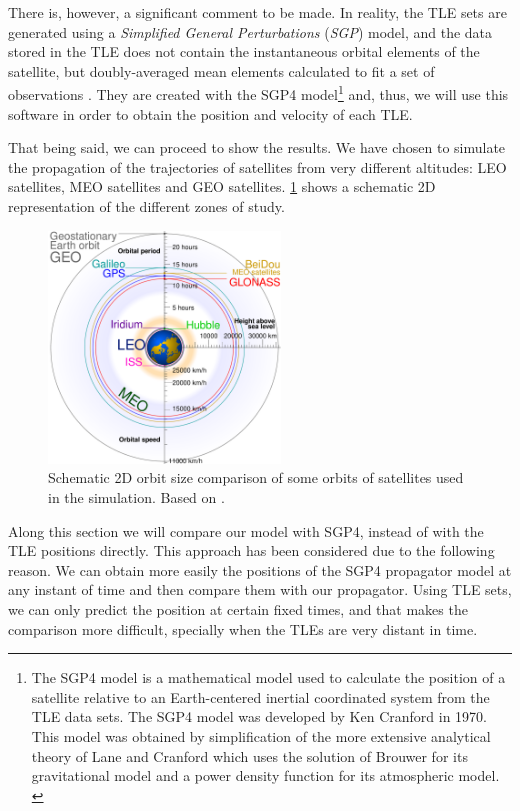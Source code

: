 \documentclass[../main.tex]{subfiles}
\begin{document}
There is, however, a significant comment to be made. In reality, the TLE sets are generated using a \emph{Simplified General Perturbations} (\emph{SGP}) model, and the data stored in the TLE does not contain the instantaneous orbital elements of the satellite, but doubly-averaged mean elements calculated to fit a set of observations \cite{celestrak,celestrakReport,sgp4OrbitDet}.
They are created with the SGP4 model\footnote{The SGP4 model is a mathematical model used to calculate the position of a satellite relative to an Earth-centered inertial coordinated system from the TLE data sets. The SGP4 model was developed by Ken Cranford in 1970. This model was obtained by simplification of the more extensive analytical theory of Lane and Cranford which uses the solution of Brouwer for its gravitational model and a power density function for its atmospheric model. \cite{matlab}} and, thus, we will use this software in order to obtain the position and velocity of each TLE.

That being said, we can proceed to show the results. We have chosen to simulate the propagation of the trajectories of satellites from very different altitudes: LEO satellites, MEO satellites and GEO satellites. \cref{fig:satellite_orbits} shows a schematic 2D representation of the different zones of study.
\begin{figure}[ht]
  \centering
  \includegraphics[width=0.55\textwidth]{Images/satellite_orbits_custom.pdf}
  \caption{Schematic 2D orbit size comparison of some orbits of satellites used in the simulation. Based on \cite{wiki:sat_orbits}.}
  \label{fig:satellite_orbits}
\end{figure}

Along this section we will compare our model with SGP4, instead of with the TLE positions directly. This approach has been considered due to the following reason. We can obtain more easily the positions of the SGP4 propagator model at any instant of time and then compare them with our propagator. Using TLE sets, we can only predict the position at certain fixed times, and that makes the comparison more difficult, specially when the TLEs are very distant in time.
\end{document}
